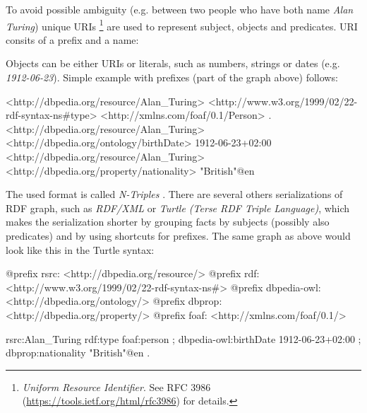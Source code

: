 \documentclass[a4paper, 12pt, twoside]{fithesis2}		%
\renewcommand{\_}{\leavevmode \kern0.07em\vbox{\hrule width0.4em}}
\begin{document}
To avoid possible ambiguity (e.g. between two people who have both name \textit{Alan Turing})
unique URIs%
\footnote{\emph{Uniform Resource Identifier}. See RFC 3986 (\url{https://tools.ietf.org/html/rfc3986}) for details.}
are used to represent subject, objects and predicates.
URI consits of a prefix and a name:
\begin{center}
\end{center}
\noindent
Objects can be either URIs or literals, such as numbers, strings or dates (e.g. \emph{1912-06-23}).
Simple example with prefixes (part of the graph above) follows:
\begin{code}
<http://dbpedia.org/resource/Alan_Turing>
    <http://www.w3.org/1999/02/22-rdf-syntax-ns#type>
    <http://xmlns.com/foaf/0.1/Person> .
<http://dbpedia.org/resource/Alan_Turing>
    <http://dbpedia.org/ontology/birthDate>
    1912-06-23+02:00
<http://dbpedia.org/resource/Alan_Turing>
   <http://dbpedia.org/property/nationality>
   "British"@en
\end{code}

The used format is called \textit{N-Triples} \cite[][68]{semantic-web}.
There are several others serializations of RDF graph, such as \textit{RDF/XML}
\cite[][73]{semantic-web}
or \emph{Turtle (Terse RDF Triple Language)},
which makes the serialization shorter by grouping facts by subjects (possibly also predicates) and by using shortcuts for prefixes. The same graph as above would look like this in the Turtle syntax:

\begin{code}
@prefix rsrc: <http://dbpedia.org/resource/>
@prefix rdf: <http://www.w3.org/1999/02/22-rdf-syntax-ns#>
@prefix dbpedia-owl: <http://dbpedia.org/ontology/>
@prefix dbprop: <http://dbpedia.org/property/>
@prefix foaf: <http://xmlns.com/foaf/0.1/>

rsrc:Alan_Turing
  rdf:type foaf:person ;
  dbpedia-owl:birthDate 1912-06-23+02:00 ;
  dbprop:nationality "British"@en .
\end{code}
\end{document}
